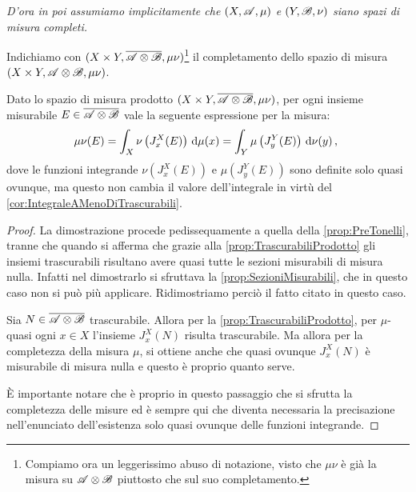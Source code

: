 \emph{D'ora in poi assumiamo implicitamente che $(X,\mathscr A,\mu)$ e $(Y,\mathscr B,\nu)$ siano spazi di misura completi.}

\begin{definition}\label{def:MisuraProdottoCompleta}
	Indichiamo con $(X\times Y,\overline{\mathscr A\otimes\mathscr B},\mu\nu)$\footnote{Compiamo ora un leggerissimo abuso di notazione, visto che $\mu\nu$ è già la misura su $\mathscr A\otimes\mathscr B$ piuttosto che sul suo completamento.} il completamento dello spazio di misura $(X\times Y,\mathscr A\otimes\mathscr B,\mu\nu)$.
\end{definition}

\begin{proposition}\label{prop:PreTonelliCompleto}
	Dato lo spazio di misura prodotto $(X\times Y,\overline{\mathscr A\otimes\mathscr B},\mu\nu)$, per ogni insieme misurabile $E\in\overline{\mathscr A\otimes\mathscr B}$ \sigfin[o] vale la seguente espressione per la misura:
	\begin{equation*}
		\mu\nu(E)=\int_X\nu\left(J_x^X(E)\right)\,\mathrm d\mu(x)=\int_Y\mu\left(J_y^Y(E)\right)\,\mathrm d\nu(y)\, \text{, }
	\end{equation*}
	dove le funzioni integrande $\nu\left(J_x^X(E)\right)$ e $\mu\left(J_y^Y(E)\right)$ sono definite solo quasi ovunque, ma questo non cambia il valore dell'integrale in virtù del \cref{cor:IntegraleAMenoDiTrascurabili}.
\end{proposition}
\begin{proof}
	La dimostrazione procede pedissequamente a quella della \cref{prop:PreTonelli}, tranne che quando si afferma che grazie alla \cref{prop:TrascurabiliProdotto} gli insiemi trascurabili risultano avere quasi tutte le sezioni misurabili di misura nulla. Infatti nel dimostrarlo si sfruttava la \cref{prop:SezioniMisurabili}, che in questo caso non si può più applicare.
	Ridimostriamo perciò il fatto citato in questo caso.
	
	Sia $N\in\overline{\mathscr A\otimes\mathscr B}$ trascurabile. Allora per la \cref{prop:TrascurabiliProdotto}, per $\mu$-quasi ogni $x\in X$ l'insieme $J_x^X(N)$ risulta trascurabile. Ma allora per la completezza della misura $\mu$,  si ottiene anche che quasi ovunque $J_x^X(N)$ è misurabile di misura nulla e questo è proprio quanto serve.
	
	È importante notare che è proprio in questo passaggio che si sfrutta la completezza delle misure ed è sempre qui che diventa necessaria la precisazione nell'enunciato dell'esistenza solo quasi ovunque delle funzioni integrande.
\end{proof}

